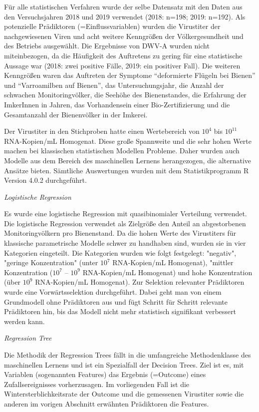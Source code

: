 Für alle statistischen Verfahren wurde der selbe Datensatz mit den Daten aus den Versuchsjahren 2018 und 2019 verwendet (2018: n=198; 2019: n=192). Als potenzielle Prädiktoren (=Einflussvariablen) wurden die Virustiter der nachgewiesenen Viren und acht weitere Kenngrößen der Völkergesundheit und des Betriebs ausgewählt. Die Ergebnisse von DWV-A wurden nicht miteinbezogen, da die Häufigkeit des Auftretens zu gering für eine statistische Aussage war (2018: zwei positive Fälle, 2019: ein positiver Fall). Die weiteren Kenngrößen waren das Auftreten der Symptome \enquote{deformierte Flügeln bei Bienen} und \enquote{Varroamilben auf Bienen}, das Untersuchungsjahr, die Anzahl der schwachen Monitoringvölker, die Seehöhe des Bienenstandes, die Erfahrung der ImkerInnen in Jahren, das Vorhandensein einer Bio-Zertifizierung und die Gesamtanzahl der Bienenvölker in der Imkerei.

Der Virustiter in den Stichproben hatte einen Wertebereich von $10^4$ bis  $10^{11}$ RNA-Kopien/\si{\milli\liter} Homogenat. Diese große Spannweite und die sehr hohen Werte machen bei klassischen statistischen Modellen Probleme. Daher wurden auch Modelle aus dem Bereich des maschinellen Lernens herangezogen, die alternative Ansätze bieten. Sämtliche Auswertungen wurden mit dem Statistikprogramm R Version 4.0.2 \citep{rcoreteam2020} durchgeführt. 

\textit{Logistische Regression}

Es wurde eine logistische Regression mit quasibinomialer Verteilung verwendet. Die logistische Regression verwendet als Zielgröße den Anteil an abgestorbenen Monitoringvölkern pro Bienenstand. Da die hohen Werte des Virustiters für klassische parametrische Modelle schwer zu handhaben sind, wurden sie in vier Kategorien eingeteilt. Die Kategorien wurden wie folgt festgelegt: "negativ", "geringe Konzentration"  (unter $10^7$ RNA-Kopien/\si{\milli\liter} Homogenat), "mittler Konzentration ($10^7$ – $10^9$ RNA-Kopien/\si{\milli\liter} Homogenat) und hohe Konzentration (über $10^9$ RNA-Kopien/\si{\milli\liter} Homogenat). Zur Selektion relevanter Prädiktoren wurde eine Vorwärtsselektion durchgeführt. Dabei geht man von einem Grundmodell ohne Prädiktoren aus und fügt Schritt für Schritt relevante Prädiktoren hin, bis das Modell nicht mehr statistisch signifikant verbessert werden kann. 

\textit{Regression Tree}

Die Methodik der Regression Trees fällt in die umfangreiche Methodenklasse des maschinellen Lernens und ist ein Spezialfall der Decision Trees. Ziel ist es, mit Variablen (sogenannten Features) das Ergebnis (=Outcome) eines Zufallsereignisses vorherzusagen. Im vorliegenden Fall ist die Wintersterblichkeitsrate der Outcome und die gemessenen Virustiter sowie die anderen im vorigen Abschnitt erwähnten Prädiktoren die Features. 

